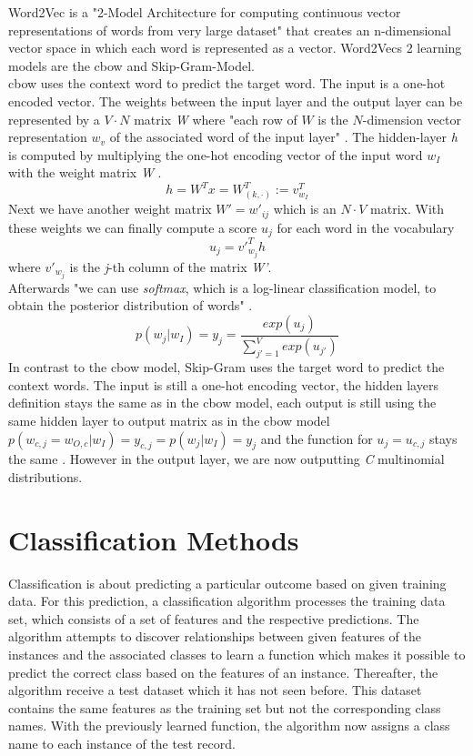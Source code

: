 \documentclass[a4paper, 11pt,titlepage,oneside,openany]{book}
\begin{document}
Word2Vec is a "2-Model Architecture for computing continuous vector representations of words from very large dataset"\cite{effiecientestimation} that creates an n-dimensional vector space in which each word is represented as a vector. Word2Vecs 2 learning models are the \gls{cbow} and Skip-Gram-Model.\\
\noindent \gls{cbow} uses the context word to predict the target word. The input is a one-hot encoded vector. The weights between the input layer and the output layer can be represented by a $V \cdot N$ matrix \textit{W} where "each row of $W$ is the $N$-dimension vector representation $w_v$ of the associated word of the input layer" \cite{word2vecparam}. The hidden-layer \textit{h} is computed by multiplying the one-hot encoding vector of the input word $w_I$ with the weight matrix \textit{W} \cite{word2vecparam}.
\[
h=W^Tx=W_{(k, \cdot)}^{T}:=v_{w_I}^{T}
\] 
Next we have another weight matrix $W'={w'_{ij}}$ which is an $N \cdot V$ matrix. With these weights we can finally compute a score $u_j$ for each word in the vocabulary \cite{word2vecparam}
\[
u_{j}={v'}_{w_j}^{T}h
\] where ${v'}_{w_j}$ is the \textit{j}-th column of the matrix \textit{W'}. \\
\newpage
\noindent Afterwards "we can use \textit{softmax}, which is a log-linear classification model, to obtain the posterior distribution of words" \cite{word2vecparam}.
\[
p(w_j|w_I)=y_j=\frac{exp(u_j)}{\sum_{j'=1}^V exp(u_{j'})}
\] 
\noindent In contrast to the \gls{cbow} model,  Skip-Gram uses the target word to predict the context words. The input is still a one-hot encoding vector, the hidden layers definition stays the same as in the \gls{cbow} model, each output is still using the same hidden layer to output matrix as in the \gls{cbow} model $p(w_{c,j}=w_{O,c}|w_I)=y_{c,j} = p(w_j|w_I)=y_j$ and the function for $u_j=u_{c,j}$ stays the same \cite{word2vecparam}. However in the output layer, we are now outputting \textit{C} multinomial distributions. 

\section{Classification Methods}
Classification is about predicting a particular outcome based on given training data. For this prediction, a classification algorithm processes the training data set, which consists of a set of features and the respective predictions. The algorithm attempts to discover relationships between given features  of the instances and the associated classes to learn a function which makes it possible to predict the correct class based on the features of an instance. Thereafter, the algorithm receive a test dataset which it has not seen before. This dataset contains the same features as the training set but not the corresponding class names. With the previously learned function, the algorithm now assigns a class name to each instance  of the test record. \\
\end{document}
